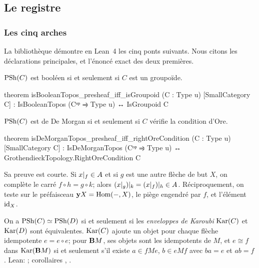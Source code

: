 \subsection{Le registre}\label{sec:registry}

\subsubsection{Les cinq arches}

La bibliothèque \lp{} démontre en Lean~4 les cinq ponts suivants. Nous citons les déclarations principales, et l'énoncé exact des deux premières.

\begin{bridge}[Booléen]\label{br:bool}
$\mathrm{PSh}(C)$ est booléen si et seulement si $C$ est un groupoïde.
\begin{leancode}
theorem isBooleanTopos_presheaf_iff_isGroupoid (C : Type u) [SmallCategory C] :
    IsBooleanTopos (Cᵒᵖ ⥤ Type u) ↔ IsGroupoid C
\end{leancode}
\end{bridge}

\begin{bridge}[De Morgan]\label{br:dm}
$\mathrm{PSh}(C)$ est de De Morgan si et seulement si $C$ vérifie la condition d'Ore.
\begin{leancode}
theorem isDeMorganTopos_presheaf_iff_rightOreCondition (C : Type u)
    [SmallCategory C] :
    IsDeMorganTopos (Cᵒᵖ ⥤ Type u) ↔ GrothendieckTopology.RightOreCondition C
\end{leancode}
Sa preuve est courte. Si $x|_{f}\in A$ et si $g$ est une autre flèche de but $X$, on complète le carré $f\circ h = g\circ k$; alors $(x|_{g})|_{k} = (x|_{f})|_{h}\in A$. Réciproquement, on teste sur le préfaisceau $\mathbf{y} X = \operatorname{Hom}(-,X)$, le piège engendré par $f$, et l'élément $\mathrm{id}_X$.
\end{bridge}

\begin{bridge}[Morita]\label{br:morita}
On a $\mathrm{PSh}(C)\simeq\mathrm{PSh}(D)$ si et seulement si les \emph{enveloppes de Karoubi} $\operatorname{Kar}(C)$ et $\operatorname{Kar}(D)$ sont équivalentes. $\operatorname{Kar}(C)$ ajoute un objet pour chaque flèche idempotente $e = e\circ e$; pour $\mathbf{B} M$, ses objets sont les idempotents de $M$, et $e\cong f$ dans $\operatorname{Kar}(\mathbf{B} M)$ si et seulement s'il existe $a\in fMe$, $b\in eMf$ avec $ba = e$ et $ab = f$. Lean: ; corollaires , .
\end{bridge}

